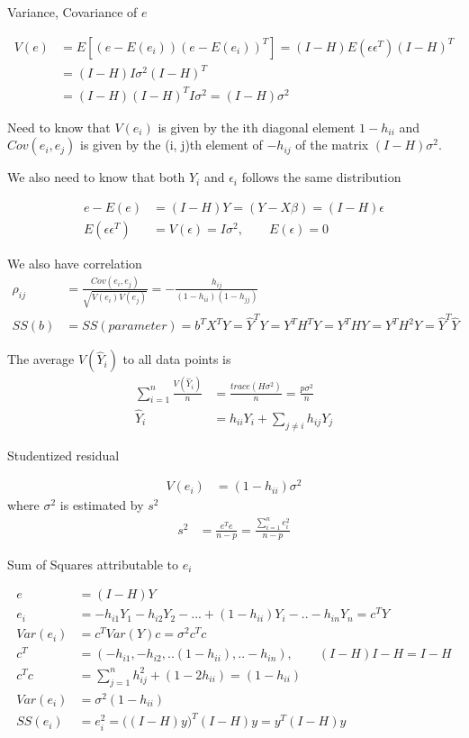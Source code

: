 \documentclass[11pt]{article} %
\begin{document}
Variance, Covariance of $e$

\begin{align*}
	V(e) &= E[(e - E(e_i)) (e - E(e_i))^T] = (I-H) E(\epsilon \epsilon^T) (I-H)^T \\
	&= (I-H) I \sigma^2 (I-H)^T \\
	&= (I-H)  (I-H)^T  I \sigma^2 = (I-H) \sigma^2
\end{align*} 

Need to know that $V(e_i)$ is given by the ith diagonal element $1 - h_{ii}$  and $Cov(e_i ,e_j )$ is given by the (i, j)th  element of $ -h_{ij}$ of the matrix $(I-H) \sigma^2$.

We also need to know that both $Y_i$ and $\epsilon_i$ follows the same distribution

\begin{align*}
	e - E(e) &= (I-H) Y = (Y- X\beta) = (I-H) \epsilon \\
	E(\epsilon \epsilon^T) &= V(\epsilon) = I\sigma^2 , \qquad E(\epsilon) = 0
\end{align*} 

We also have correlation
\begin{align*}
   \rho_{ij} &= \frac{Cov(e_i, e_j)}{\sqrt{V(e_i)V(e_j)}} = -\frac{h_{ij}}{(1-h_{ii}) (1-h_{jj})} \\
   SS(b) &= SS(parameter) = b^T X^T Y = \hat{Y}^T Y = Y^T H^T Y =  Y^T H Y =  Y^T H^2 Y = \hat{Y}^T \hat{Y}
\end{align*} 

The average $V(\hat{Y}_i)$ to all data points is
\begin{align*}
	\sum_{i=1}^n \frac{V(\hat{Y}_i)}{n} &= \frac{trace(H \sigma^2)}{n} = \frac{p \sigma^2}{n} \\
	\hat{Y}_i &= h_{ii}Y_i + \sum_{j \neq i} h_{ij} Y_j
\end{align*} 

Studentized residual

\begin{align*}
	 V(e_i) & = (1- h_{ii}) \sigma^2 
\end{align*} 
where $\sigma^2$ is estimated by $s^2$
\begin{align*}
 s^2 & = \frac{e^T e}{n-p} = \frac{\sum_{i=1}^n e_i^2}{n-p}
\end{align*} 

Sum of Squares attributable to $e_i$

\begin{align*}
	e & = (I-H)Y\\
	e_i &= -h_{i1} Y_1 - h_{i2} Y_2 - ... + (1- h_{ii}) Y_i -.. -h_{in} Y_n = c^T Y\\
	Var(e_i) &= c^T Var(Y) c = \sigma^2 c^T c \\
	c^T &= ( -h_{i1}, - h_{i2}, ..  (1- h_{ii}), .. -h_{in}), \qquad (I-H) I-H = I-H\\
	c^T c &= \sum_{j=1}^n h_{ij}^2 + (1- 2h_{ii}) = (1-h_{ii})\\
	Var(e_i) &=  \sigma^2 (1-h_{ii}) \\
	SS(e_i) &= {e_i^2} = \Big((I-H)y\Big)^T (I-H)y = y^T (I-H) y
\end{align*} 
\end{document}
